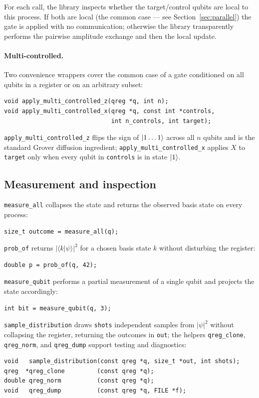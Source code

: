 For each call, the library inspects whether the target/control qubits are local to this process. If both are local (the common case --- see Section~\ref{sec:parallel}) the gate is applied with no communication; otherwise the library transparently performs the pairwise amplitude exchange and then the local update.

\paragraph{Multi-controlled.} Two convenience wrappers cover the common case of a gate conditioned on all qubits in a register or on an arbitrary subset:
\begin{lstlisting}
void apply_multi_controlled_z(qreg *q, int n);
void apply_multi_controlled_x(qreg *q, const int *controls,
                              int n_controls, int target);
\end{lstlisting}
\verb|apply_multi_controlled_z| flips the sign of $\mathinner{|{1\dots1}\rangle}$ across all $n$ qubits and is the standard Grover diffusion ingredient; \verb|apply_multi_controlled_x| applies $X$ to \texttt{target} only when every qubit in \texttt{controls} is in state $\mathinner{|{1}\rangle}$.

\subsection{Measurement and inspection}

\verb|measure_all| collapses the state and returns the observed basis state on every process:
\begin{lstlisting}
size_t outcome = measure_all(q);
\end{lstlisting}

\verb|prob_of| returns $|\langle k | \psi \rangle|^2$ for a chosen basis state $k$ without disturbing the register:
\begin{lstlisting}
double p = prob_of(q, 42);
\end{lstlisting}

\verb|measure_qubit| performs a partial measurement of a single qubit and projects the state accordingly:
\begin{lstlisting}
int bit = measure_qubit(q, 3);
\end{lstlisting}

\verb|sample_distribution| draws \texttt{shots} independent samples from $|\psi|^2$ without collapsing the register, returning the outcomes in \texttt{out}; the helpers \verb|qreg_clone|, \verb|qreg_norm|, and \verb|qreg_dump| support testing and diagnostics:
\begin{lstlisting}
void   sample_distribution(const qreg *q, size_t *out, int shots);
qreg  *qreg_clone         (const qreg *q);
double qreg_norm          (const qreg *q);
void   qreg_dump          (const qreg *q, FILE *f);
\end{lstlisting}

